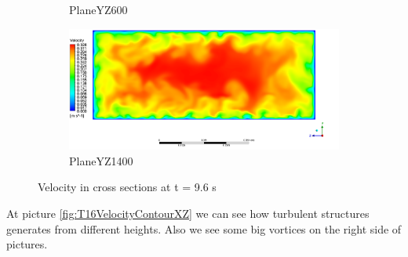 \begin{figure}[H]
\begin{subfigure}{.5\textwidth}
			\caption{PlaneYZ600}
			\label{fig:T96VelocityContourYZ600}
		\end{subfigure}%
		\begin{subfigure}{.5\textwidth}
			\centering
			\includegraphics[width=1.1\linewidth]{../Assets/T96_Velocity_ContourYZ1400}
			\caption{PlaneYZ1400}
			\label{fig:T96VelocityContourYZ1400}
		\end{subfigure}
		\caption{Velocity in cross sections at t = 9.6 s}
		\label{fig:T96VelocityContourYZ}
	\end{figure}
	\newpage
	At picture \ref{fig:T16VelocityContourXZ} we can see how turbulent structures generates from different heights. Also we see some big vortices on the right side of pictures.
